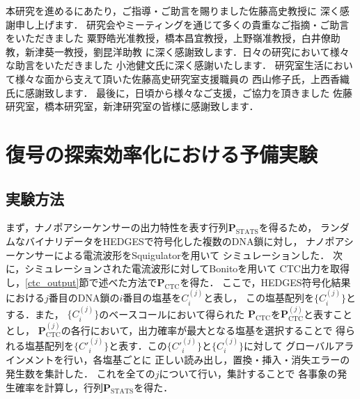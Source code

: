 \documentclass[sotsuron]{kuee}
\begin{document}
\begin{acknowledgements}
本研究を進めるにあたり，ご指導・ご助言を賜りました佐藤高史教授に
深く感謝申し上げます．
研究会やミーティングを通じて多くの貴重なご指摘・ご助言をいただきました
粟野皓光准教授，橋本昌宜教授，上野嶺准教授，白井僚助教，新津葵一教授，劉昆洋助教
に深く感謝致します．日々の研究において様々な助言をいただきました
小池健文氏に深く感謝いたします．
研究室生活において様々な面から支えて頂いた佐藤高史研究室支援職員の
西山修子氏，上西香織氏に感謝致します．
最後に，日頃から様々なご支援，ご協力を頂きました
佐藤研究室，橋本研究室，新津研究室の皆様に感謝致します．
\end{acknowledgements}








\appendix
\chapter{復号の探索効率化における予備実験}
\section{実験方法}
まず，ナノポアシーケンサーの出力特性を表す行列$\bm{P}_{\mathrm{STATS}}$を得るため，
ランダムなバイナリデータをHEDGESで符号化した複数のDNA鎖に対し，
ナノポアシーケンサーによる電流波形をSquigulatorを用いて
シミュレーションした．
次に，シミュレーションされた電流波形に対してBonitoを用いて
CTC出力を取得し，\ref{ctc_output}節で述べた方法で$\bm{P}_{\mathrm{CTC}}$を得た．
ここで，HEDGES符号化結果における$j$番目のDNA鎖の$i$番目の塩基を$C_i^{(j)}$と表し，
この塩基配列を$\{C_i^{(j)}\}$とする．また，
$\{C_i^{(j)}\}$のベースコールにおいて得られた
$\bm{P}_{\mathrm{CTC}}$を$\bm{P}_{\mathrm{CTC}}^{(j)}$と表すこととし，
$\bm{P}_{\mathrm{CTC}}^{(j)}$の各行において，出力確率が最大となる塩基を選択することで
得られる塩基配列を$\{C'^{(j)}_i\}$と表す．この$\{C'^{(j)}_i\}$と$\{C_i^{(j)}\}$に対して
グローバルアラインメントを行い，各塩基ごとに
正しい読み出し，置換・挿入・消失エラーの発生数を集計した\cite{GOTOH1982705}．
これを全ての$j$について行い，集計することで
各事象の発生確率を計算し，行列$\bm{P}_{\mathrm{STATS}}$を得た．
\end{document}
